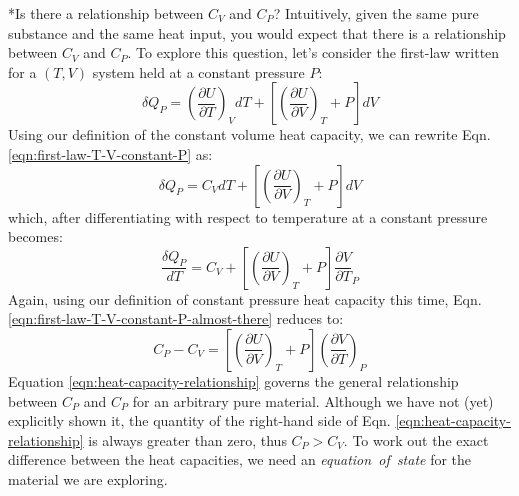 \documentclass[11pt]{article}
\makeatletter
\theoremstyle{definition}
\renewcommand\subsubsection{\@startsection
	{subsubsection}{2}{0mm}
	{-0.05in}
	{-0.5\baselineskip}
	{\normalfont\normalsize\itshape}}
\makeatother
\begin{document}
\subsubsection*{Is there a relationship between $C_{V}$ and $C_{P}$?}
Intuitively, given the same pure substance and the same heat input, you would expect that there is a relationship between $C_{V}$ and $C_{P}$. To explore this question, let's consider
the first-law written for a $(T,V)$ system held at a constant pressure $P$:
\begin{equation}\label{eqn:first-law-T-V-constant-P}
	\delta{Q}_{P} = \left(\frac{\partial{U}}{\partial{T}}\right)_{V}dT + \left[\left(\frac{\partial{U}}{\partial{V}}\right)_{T} + P\right]dV
\end{equation}Using our definition of the constant volume heat capacity, we can rewrite Eqn. \eqref{eqn:first-law-T-V-constant-P} as:
\begin{equation}
	\delta{Q}_{P} = C_{V}dT + \left[\left(\frac{\partial{U}}{\partial{V}}\right)_{T} + P\right]dV
\end{equation}which, after differentiating with respect to temperature at a constant pressure becomes:
\begin{equation}\label{eqn:first-law-T-V-constant-P-almost-there}
	\frac{\delta{Q}_{P}}{dT} = C_{V} + \left[\left(\frac{\partial{U}}{\partial{V}}\right)_{T} + P\right]\frac{\partial{V}}{\partial{T}}_{P}
\end{equation}Again, using our definition of constant pressure heat capacity this time, Eqn. \eqref{eqn:first-law-T-V-constant-P-almost-there} reduces to:
\begin{equation}\label{eqn:heat-capacity-relationship}
	C_{P} - C_{V} = \left[\left(\frac{\partial{U}}{\partial{V}}\right)_{T} + P\right]\left(\frac{\partial{V}}{\partial{T}}\right)_{P}
\end{equation}
Equation \eqref{eqn:heat-capacity-relationship} governs the general relationship between $C_{P}$ and $C_{P}$ for an arbitrary pure material.
Although we have not (yet) explicitly shown it, the quantity of the right-hand side of Eqn. \eqref{eqn:heat-capacity-relationship} is always greater than zero, thus $C_{P}>{C_{V}}$.
To work out the exact difference between the heat capacities, we need an \textit{equation~of~state} for the material we are exploring.
\end{document}
